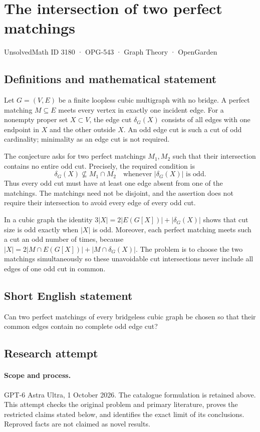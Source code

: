 \documentclass[11pt,a4paper]{article}
\begin{document}
\section*{The intersection of two perfect matchings}\label{3180}
{\small UnsolvedMath ID 3180 · OPG-543 · Graph Theory · OpenGarden}
\subsection{Definitions and mathematical statement}
Let $G=(V,E)$ be a finite loopless cubic multigraph with
no bridge. A perfect matching $M\subseteq E$ meets every
vertex in exactly one incident edge. For a nonempty proper
set $X\subset V$, the edge cut $\delta_G(X)$ consists of
all edges with one endpoint in $X$ and the other outside
$X$. An odd edge cut is such a cut of odd cardinality;
minimality as an edge cut is not required.

The conjecture asks for two perfect matchings $M_1,M_2$
such that their intersection contains no entire odd cut.
Precisely, the required condition is
\[
 \delta_G(X)\not\subseteq M_1\cap M_2
 \quad\text{whenever }|\delta_G(X)|\text{ is odd}.
\]
Thus every odd cut must have at least one edge absent
from one of the matchings. The matchings need not be
disjoint, and the assertion does not require their
intersection to avoid every edge of every odd cut.

In a cubic graph the identity
$3|X|=2|E(G[X])|+|\delta_G(X)|$ shows that cut size is
odd exactly when $|X|$ is odd. Moreover, each perfect
matching meets such a cut an odd number of times, because
$|X|=2|M\cap E(G[X])|+|M\cap\delta_G(X)|$.
The problem is to choose the two matchings simultaneously
so these unavoidable cut intersections never include
all edges of one odd cut in common.
\subsection{Short English statement}
Can two perfect matchings of every bridgeless cubic graph be chosen so that their common edges contain no complete odd edge cut?
\subsection{Research attempt}
\paragraph{Scope and process.}
GPT-6 Astra Ultra, 1 October 2026. The catalogue formulation is retained above. This attempt checks the original problem and primary literature, proves the restricted claims stated below, and identifies the exact limit of its conclusions. Reproved facts are not claimed as novel results.
\end{document}
